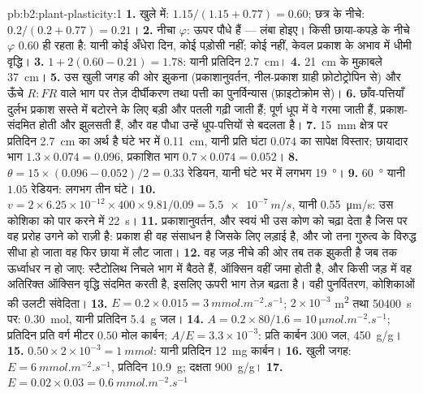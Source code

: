 \begin{solution}{pb:b2:plant-plasticity:1}
\textbf{1.} खुले में: $1.15/(1.15 + 0.77) = 0.60$; छत्र के नीचे: $0.2/(0.2 +
0.77) = 0.21$।
\textbf{2.} नीचा $\varphi$: ऊपर पौधे हैं --- लंबा होइए। किसी
छाया-कपड़े के नीचे $\varphi$ $0.60$ ही रहता है: यानी कोई अँधेरा दिन, कोई पड़ोसी नहीं; कोई
 नहीं, केवल प्रकाश के अभाव में धीमी वृद्धि।
\textbf{3.} $1 + 2(0.60 - 0.21) = 1.78$: यानी प्रतिदिन \qty{2.7}{cm}।
\textbf{4.} \qty{21}{cm} के मुक़ाबले \qty{37}{cm}।
\textbf{5.} उस खुली जगह की ओर झुकना (प्रकाशानुवर्तन, नील-प्रकाश
ग्राही फ़ोटोट्रोपिन से) और ऊँचे $R{:}FR$ वाले भाग पर तेज़ दीर्घीकरण
तथा पत्ती का पुनर्विन्यास (फ़ाइटोक्रोम से)।
\textbf{6.} छाँव-पत्तियाँ दुर्लभ प्रकाश सस्ते में बटोरने के लिए बड़ी और
पतली गढ़ी जाती हैं; पूर्ण धूप में वे गरमा जाती हैं, प्रकाश-संदमित होती
और झुलसती हैं, और वह पौधा उन्हें धूप-पत्तियों से बदलता है।
\textbf{7.} \qty{15}{mm} क्षेत्र पर प्रतिदिन \qty{2.7}{cm} का अर्थ है
घंटे भर में \qty{0.11}{cm}, यानी प्रति घंटा $0.074$ का सापेक्ष विस्तार;
छायादार भाग $1.3\times 0.074 = 0.096$, प्रकाशित भाग $0.7\times 0.074 =
0.052$।
\textbf{8.} $\theta = 15\times(0.096 - 0.052)/2 = 0.33$ रेडियन, यानी
घंटे भर में लगभग \qty{19}{\degree}।
\textbf{9.} \qty{60}{\degree} यानी $1.05$ रेडियन: लगभग तीन घंटे।
\textbf{10.} $v = 2\times 6.25\times 10^{-12}\times 400\times
9.81/0.09 = \qty{5.5e-7}{m/s}$, यानी \qty{0.55}{\micro m/s}: उस कोशिका
को पार करने में \qty{22}{s}।
\textbf{11.} प्रकाशानुवर्तन, और  स्वयं भी उस
कोण को चढ़ा देता है जिस पर वह प्ररोह उगने को राज़ी है: प्रकाश ही वह
संसाधन है जिसके लिए लड़ाई है, और जो तना गुरुत्व के विरुद्ध सीधा हो जाता
वह फिर छाया में लौट जाता।
\textbf{12.} वह जड़ नीचे की ओर तब तक झुकती है जब तक ऊर्ध्वाधर न हो जाए:
स्टैटोलिथ निचले भाग में बैठते हैं, ऑक्सिन वहीं जमा होती है, और किसी जड़
में वह अतिरिक्त ऑक्सिन वृद्धि संदमित करती है, इसलिए ऊपरी भाग तेज़ बढ़ता
है। वही पुनर्वितरण, कोशिकाओं की उलटी संवेदिता।
\textbf{13.} $E = 0.2\times 0.015 = \qty{3}{mmol.m^{-2}.s^{-1}}$;
$2\times 10^{-3}$ \unit{m^2} तथा \qty{50400}{s} पर: \qty{0.30}{mol},
यानी प्रतिदिन \qty{5.4}{g} जल।
\textbf{14.} $A = 0.2\times 80/1.6 = \qty{10}{\micro mol.m^{-2}.s^{-1}}$;
प्रतिदिन प्रति वर्ग मीटर $0.50$ मोल कार्बन; $A/E = 3.3\times
10^{-3}$: प्रति कार्बन 300 जल, \qty{450}{g/g}।
\textbf{15.} $0.50\times 2\times 10^{-3} = \qty{1}{mmol}$: यानी
प्रतिदिन \qty{12}{mg} कार्बन।
\textbf{16.} खुली जगह: $E = \qty{6}{mmol.m^{-2}.s^{-1}}$, प्रतिदिन
\qty{10.9}{g}; दक्षता \qty{900}{g/g}।
\textbf{17.} $E = 0.02\times 0.03 = \qty{0.6}{mmol.m^{-2}.s^{-1}}$

\end{solution}
